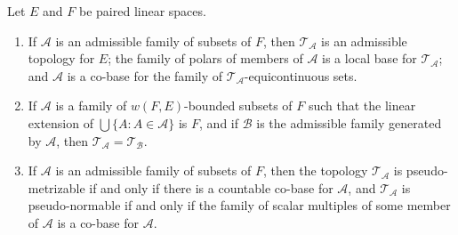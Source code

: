 Let $E$ and $F$ be paired linear spaces.

\begin{enumerate}
\item[(i)] If $\mathcal{A}$ is an admissible family of subsets of $F$, then $\mathcal{T}_{\mathcal{A}}$ is an admissible topology for $E$; the family of polars of members of $\mathcal{A}$ is a local base for $\mathcal{T}_{\mathcal{A}}$; and $\mathcal{A}$ is a co-base for the family of $\mathcal{T}_{\mathcal{A}}$-equicontinuous sets.

\item[(ii)] If $\mathcal{A}$ is a family of $w(F, E)$-bounded subsets of $F$ such that the linear extension of $\bigcup \{A : A \in \mathcal{A}\}$ is $F$, and if $\mathcal{B}$ is the admissible family generated by $\mathcal{A}$, then $\mathcal{T}_{\mathcal{A}} = \mathcal{T}_{\mathcal{B}}$.

\item[(iii)] If $\mathcal{A}$ is an admissible family of subsets of $F$, then the topology $\mathcal{T}_{\mathcal{A}}$ is pseudo-metrizable if and only if there is a countable co-base for $\mathcal{A}$, and $\mathcal{T}_{\mathcal{A}}$ is pseudo-normable if and only if the family of scalar multiples of some member of $\mathcal{A}$ is a co-base for $\mathcal{A}$.
\end{enumerate}
